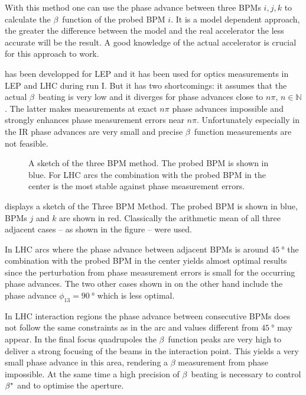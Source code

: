 With this method one can use the phase advance between three BPMs $i,j,k$ to calculate the $\beta$~function
of the probed BPM $i$. It is a model dependent approach, the greater the difference between the model
and the real accelerator the less accurate will be the result. A good knowledge of the actual accelerator
is crucial for this approach to work.

 has been developped for LEP and it has been used for optics measurements in LEP
and LHC during run I.
But it has two shortcomings: it assumes that the actual $\beta$~beating is very low and it
diverges for phase advances close to $n\pi$, $n \in \mathbb{N}$. The latter makes measurements at
exact $n\pi$ phase advances impossible and strongly enhances phase measurement errors near $n\pi$.
Unfortunately especially in the IR phase advances are very small and precise $\beta$~function measurements
are not feasible.

\begin{figure}
    \centering
     
    \caption{A sketch of the three BPM method. The probed BPM is shown in blue. For LHC arcs the
    combination with the probed BPM in the center is the most stable against phase measurement errors.}
    \label{fig_threebpm}
\end{figure}

 displays a sketch of the Three BPM Method. The probed BPM is shown in blue,
BPMs $j$ and $k$ are shown in red.
Classically the arithmetic mean of all three adjacent cases -- as shown in the figure -- were used.


In LHC arcs where the phase advance between adjacent BPMs is around
$\SI{45}{\degree}$ the combination with the probed BPM in the center yields almost optimal results
since the perturbation from phase measurement errors is small for the occurring phase advances.
The two other cases shown in  on the other hand include the 
phase advance $\phi_{13} = \SI{90}{\degree}$ which is less optimal.

In LHC interaction regions the phase advance between consecutive BPMs does not follow the same constraints
as in the arc and values different from $\SI{45}{\degree}$ may appear. In the final focus quadrupoles
the $\beta$~function peaks are very high to deliver a strong focusing of the beams in the interaction
point. This yields a very small phase advance in this area, rendering a $\beta$ measurement from phase
impossible. At the same time a high precision of $\beta$~beating is necessary to control $\beta^*$ and
to optimise the aperture.

